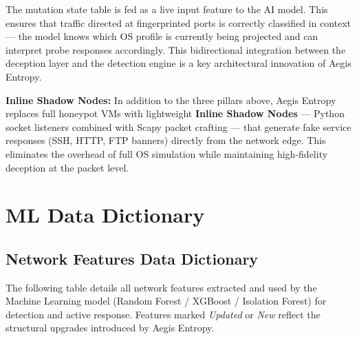 \documentclass[12pt,a4paper]{report}
\begin{document}
The mutation state table is fed as a live input feature to the AI model. This ensures that
traffic directed at fingerprinted ports is correctly classified in context --- the model knows
which OS profile is currently being projected and can interpret probe responses accordingly.
This bidirectional integration between the deception layer and the detection engine is a key
architectural innovation of Aegis Entropy.

\bigskip
\noindent\textbf{Inline Shadow Nodes:} In addition to the three pillars above, Aegis Entropy
replaces full honeypot VMs with lightweight \textbf{Inline Shadow Nodes} --- Python socket
listeners combined with Scapy packet crafting --- that generate fake service responses (SSH,
HTTP, FTP banners) directly from the network edge. This eliminates the overhead of full OS
simulation while maintaining high-fidelity deception at the packet level.

\part{ML Data Dictionary}

\chapter{Network Features Data Dictionary}

The following table details all network features extracted and used by the Machine Learning
model (Random Forest / XGBoost / Isolation Forest) for detection and active response.
Features marked \textit{Updated} or \textit{New} reflect the structural upgrades introduced by
Aegis Entropy.
\end{document}
